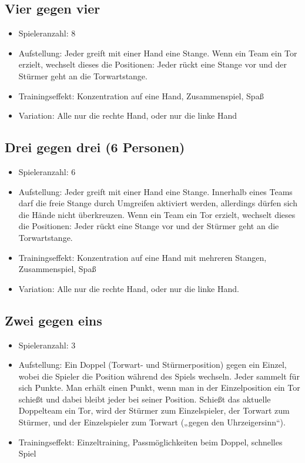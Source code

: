 \subsection{Vier gegen vier}
\label{spielformen:npersonen:viergegenvier}

\begin{itemize}
\item Spieleranzahl: 8
\item Aufstellung: Jeder greift mit einer Hand eine Stange.
Wenn ein Team ein Tor erzielt, wechselt dieses die Positionen: Jeder rückt
eine Stange vor und der Stürmer geht an die Torwartstange.
\item Trainingseffekt: Konzentration auf eine Hand, Zusammenspiel, Spaß
\item Variation: Alle nur die rechte Hand, oder nur die linke Hand
\end{itemize}

\subsection{Drei gegen drei (6 Personen)}
\label{spielformen:npersonen:dreigegendrei}

\begin{itemize}
\item Spieleranzahl: 6
\item Aufstellung: Jeder greift mit einer Hand eine Stange.
Innerhalb eines Teams darf die freie Stange durch Umgreifen aktiviert werden, allerdings
dürfen sich die Hände nicht überkreuzen.
Wenn ein Team ein Tor erzielt, wechselt dieses die Positionen: Jeder rückt
eine Stange vor und der Stürmer geht an die Torwartstange.
\item Trainingseffekt: Konzentration auf eine Hand mit mehreren Stangen, Zusammenspiel, Spaß
\item Variation: Alle nur die rechte Hand, oder nur die linke Hand. 
\end{itemize}

\subsection{Zwei gegen eins}
\label{spielformen:npersonen:jedergegenjeden}

\begin{itemize}
\item Spieleranzahl:  3
\item Aufstellung: Ein Doppel (Torwart- und Stürmerposition) gegen ein Einzel, wobei die Spieler die Position während des Spiels wechseln.
Jeder sammelt für sich Punkte. Man erhält einen Punkt, wenn man in der
Einzelposition ein Tor schießt und dabei bleibt jeder bei seiner Position. 
Schießt das
aktuelle Doppelteam ein Tor, wird der Stürmer zum Einzelspieler, der Torwart zum
Stürmer, und der Einzelspieler zum Torwart („gegen den Uhrzeigersinn“).
\item Trainingseffekt: Einzeltraining, Passmöglichkeiten beim Doppel, schnelles Spiel
\end{itemize}


